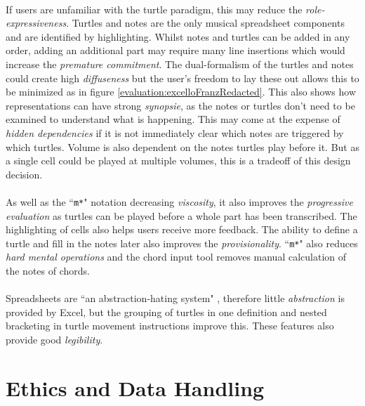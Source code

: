 \paragraph{} If users are unfamiliar with the turtle paradigm, this may reduce the \textit{role-expressiveness}. Turtles and notes are the only musical spreadsheet components and are identified by highlighting. Whilst notes and turtles can be added in any order, adding an additional part may require many line insertions which would increase the \textit{premature commitment}. The dual-formalism of the turtles and notes could create high \textit{diffuseness} but the user's freedom to lay these out allows this to be minimized as in figure \ref{evaluation:excelloFranzRedacted}. This also shows how representations can have strong \textit{synopsie}, as the notes or turtles don't need to be examined to understand what is happening. This may come at the expense of \textit{hidden dependencies} if it is not immediately clear which notes are triggered by which turtles. Volume is also dependent on the notes turtles play before it. But as a single cell could be played at multiple volumes, this is a tradeoff of this design decision.

\paragraph{} As well as the ``\texttt{m*}" notation decreasing \textit{viscosity}, it also improves the \textit{progressive evaluation} as turtles can be played before a whole part has been transcribed. The highlighting of cells also helps users receive more feedback. The ability to define a turtle and fill in the notes later also improves the \textit{provisionality}. ``\texttt{m*}" also reduces \textit{hard mental operations} and the chord input tool removes manual calculation of the notes of chords.

\paragraph{} Spreadsheets are ``an abstraction-hating system" \cite{blackwell:tutorial}, therefore little \textit{abstraction} is provided by Excel, but the grouping of turtles in one definition and nested bracketing in turtle movement instructions improve this. These features also provide good \textit{legibility}.

\section{Ethics and Data Handling}

